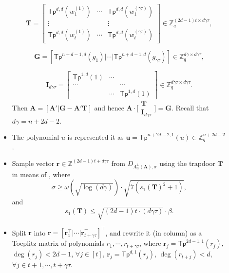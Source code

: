 \documentclass[runningheads]{llncs}
\begin{document}
\begin{description}
\begin{itemize}
	\begin{equation}\label{k34}
\mathbf{T}= \begin{bmatrix}
\mathsf{Tp}^{d,d}(w^{(1)}_1) & \cdots & \mathsf{Tp}^{d,d}(w^{(\gamma\tau)}_1 )\\
\vdots &  & \vdots\\
\mathsf{Tp}^{d,d}(w^{(1)}_t) & \cdots & \mathsf{Tp}^{d,d}(w^{(\gamma\tau)}_t )
\end{bmatrix} \in \mathbb{Z}_q^{(2d-1)t \times d\gamma \tau},
	\end{equation}


	\begin{equation}\label{k2}
\mathbf{G}=[\mathsf{Tp}^{n+d-1,d}(g_1)|\cdots|\mathsf{Tp}^{n+d-1,d}(g_{\gamma \tau})] \in \mathbb{Z}_q^{d\gamma \times d\gamma \tau},
\end{equation}

$$\mathbf{I}_{d\gamma\tau}=\begin{bmatrix}
\mathsf{Tp}^{1,d}(1) & \cdots & \\
\cdots &  & \cdots\\
 & \cdots & \mathsf{Tp}^{1,d}(1)
\end{bmatrix}  \in \mathbb{Z}_q^{d\gamma \tau \times d\gamma \tau}.$$
Then  $\mathbf{A}=[\mathbf{A}'|\mathbf{G}-\mathbf{A}'\mathbf{T}]$ and hence $\mathbf{A}\cdot \bigl[ \begin{smallmatrix}
\mathbf{T}\\ \mathbf{I}_{d\gamma\tau}
\end{smallmatrix} \bigr]=\mathbf{G}$. Recall that $d\gamma=n+2d-2.$

\item The polynomial $u$ is represented it as $\textbf{u}=\mathsf{Tp}^{n+2d-2,1}(u) \in \mathbb{Z}_q^{n+2d-2}$.
\item Sample vector $\textbf{r} \in \mathbb{Z}^{(2d-1)t+d\gamma\tau}$ from $D_{\Lambda^{\bot}_{\textbf{u}}(\textbf{A}),\sigma}$ using the trapdoor $\textbf{T}$ in means of \cite{MP12}, where %
\begin{equation}\label{k12}
\sigma \geq \omega(\sqrt{\log(d \gamma)})\cdot \sqrt{7(s_1(\mathbf{T})^2+1)},%
\end{equation}
and
\begin{equation}\label{k19}
s_1(\mathbf{T}) \leq \sqrt{(2d-1)t \cdot (d\gamma \tau)}\cdot \beta.
\end{equation}

\item Split $\textbf{r}$ into $\textbf{r}=[\textbf{r}_1^{\top}|\cdots| \textbf{r}^{\top}_{t+\gamma \tau}]^{\top}$, and rewrite it (in column) as a Toeplitz matrix of polynomials $r_1, \cdots, r_{t+\gamma\tau}$, where $\textbf{r}_j=\mathsf{Tp}^{2d-1,1}(r_{j})$,  $\deg(r_j)<2d-1$, $\forall j\in [t]$,  $\textbf{r}_j=\mathsf{Tp}^{d,1}(r_{j})$, $\deg(r_{t+j}) <d$,$\forall j\in {t+1, \cdots, t+\gamma\tau}$.


\end{itemize}
\end{description}
\end{document}
